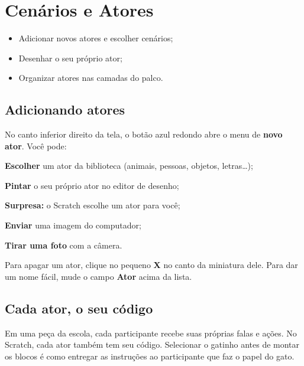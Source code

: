 \chapter{Cenários e Atores}

\begin{objetivos}
\begin{itemize}
\item Adicionar novos atores e escolher cenários;
\item Desenhar o seu próprio ator;
\item Organizar atores nas camadas do palco.
\end{itemize}
\end{objetivos}

\section{Adicionando atores}

No canto inferior direito da tela, o botão azul redondo abre o menu de \textbf{novo ator}. Você pode:

\begin{passos}
\item \textbf{Escolher} um ator da biblioteca (animais, pessoas, objetos, letras\ldots);
\item \textbf{Pintar} o seu próprio ator no editor de desenho;
\item \textbf{Surpresa:} o Scratch escolhe um ator para você;
\item \textbf{Enviar} uma imagem do computador;
\item \textbf{Tirar uma foto} com a câmera.
\end{passos}

\begin{dica}
Para apagar um ator, clique no pequeno \textbf{X} no canto da miniatura dele. Para dar um nome fácil, mude o campo \textbf{Ator} acima da lista.
\end{dica}

\section{Cada ator, o seu código}

\begin{pensaassim}
Em uma peça da escola, cada participante recebe suas próprias falas e ações. No Scratch, cada ator também tem seu código. Selecionar o gatinho antes de montar os blocos é como entregar as instruções ao participante que faz o papel do gato.
\end{pensaassim}

